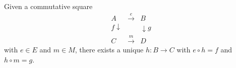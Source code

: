 Given a commutative square
$$
\begin{array}{ccc}
A & \xrightarrow{e} & B \\
{\scriptstyle f}\downarrow & & \downarrow{\scriptstyle g} \\
C & \xrightarrow{m} & D
\end{array}
$$
with $e \in E$ and $m \in M$, there exists a unique $h: B \longrightarrow C$ with $e \circ h = f$ and $h \circ m = g$.
